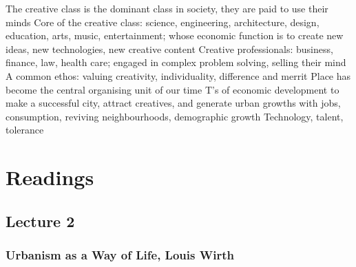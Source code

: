 \documentclass{article}
\begin{document}
\begin{outline}
	\1 The creative class is the dominant class in society, they are paid to use their minds
		\2 Core of the creative class: science, engineering, architecture, design, education, arts, music, entertainment; whose economic function is to create new ideas, new technologies, new creative content
		\2 Creative professionals: business, finance, law, health care; engaged in complex problem solving, selling their mind 
		\2 A common ethos: valuing creativity, individuality, difference and merrit
	\1 Place has become the central organising unit of our time
	 T's of economic development to make a successful city, attract creatives, and generate urban growths with jobs, consumption, reviving neighbourhoods, demographic growth
		\1 Technology, talent, tolerance
\end{outline}




\section{Readings}

\subsection{Lecture 2}

\subsubsection{Urbanism as a Way of Life, Louis Wirth}
\end{document}
